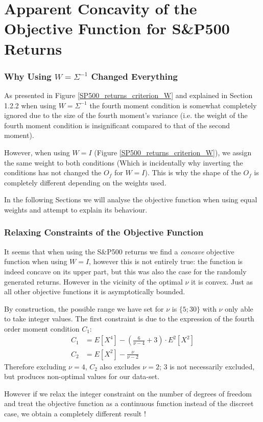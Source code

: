 \chapter{Apparent Concavity of the Objective Function for S\&P500 Returns}


\subsection{Why Using $W=\Sigma^{-1}$ Changed Everything}

As presented in Figure \ref{SP500_returns_criterion_W} and explained in Section 1.2.2 when using $W=\Sigma^{-1}$ the fourth moment condition is somewhat completely ignored due to the size of the fourth moment's variance (i.e. the weight of the fourth moment condition is insignificant compared to that of the second moment).
\smallskip\par
However, when using $W=I$ (Figure \ref{SP500_returns_criterion_W}), we assign the same weight to both conditions (Which is incidentally why inverting the conditions has not changed the $O_f$ for $W=I$). This is why the shape of the $O_f$ is completely different depending on the weights used.
\smallskip\par
In the following Sections we will analyse the objective function when using equal weights and attempt to explain its behaviour.



\subsection{Relaxing Constraints of the Objective Function}

It seems that when using the S\&P500 returns we find a \emph{concave} objective function when using $W=I$, however this is not entirely true: the function is indeed concave on its upper part, but this was also the case for the randomly generated returns. However in the vicinity of the optimal $\nu$ it is convex. Just as all other objective functions it is asymptotically bounded. \smallskip
\par
By construction, the possible range we have set for $\nu$ is $\{5;30\}$ with $\nu$ only able to take integer values. The first constraint is due to the expression of the fourth order moment condition $C_1$:
\begin{align*}
    C_1 &= E\left[X^4\right] - \left(\frac{6}{\nu-4}+3\right)\cdot E^2\left[X^2\right] \\
    C_2 &= E\left[X^2\right] - \frac{\nu}{\nu - 2}
\end{align*}
Therefore excluding $\nu = 4$, $C_2$ also excludes $\nu=2$; $3$ is not necessarily excluded, but produces non-optimal values for our data-set.
\smallskip\par
However if we relax the integer constraint on the number of degrees of freedom and treat the objective function as a continuous function instead of the discreet case, we obtain a completely different result !


